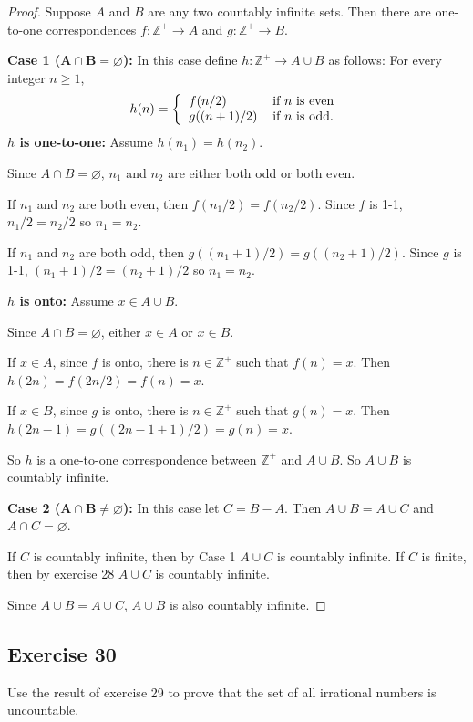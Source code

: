 \documentclass[14pt]{extarticle}
\newcommand{\es}{\varnothing}
\newcommand{\Z}{\mathbb{Z}}
\begin{document}
\begin{proof}
    Suppose $A$ and $B$ are any two countably infinite sets. Then there are one-to-one correspondences \(f: \Z^+ \to A\) and \(g: \Z^+ \to B\).

        {\bf Case 1 (\(\bm{A \cap B = \es}\)):} In this case define \(h: \Z^+ \to A \cup B\) as follows: For every integer \(n \geq 1\),
    \[
        h(n) =
        \left\{
        \begin{tabular}{ll}
            \(f(n/2)\)     & if $n$ is even \\
            \(g((n+1)/2)\) & if $n$ is odd.
        \end{tabular}
        \right.
    \]
    {\bf $h$ is one-to-one:} Assume \(h(n_1) = h(n_2)\).

    Since \(A \cap B = \es\), $n_1$ and $n_2$ are either both odd or both even.

    If $n_1$ and $n_2$ are both even, then \(f(n_1/2) =f(n_2/2)\). Since $f$ is 1-1, \(n_1/2 = n_2/2\) so \(n_1 = n_2\).

    If $n_1$ and $n_2$ are both odd, then \(g((n_1+1)/2) = g((n_2+1)/2)\). Since $g$ is 1-1, \((n_1+1)/2 = (n_2+1)/2\)
    so \(n_1 = n_2\).

        {\bf $h$ is onto:} Assume \(x \in A \cup B\).

    Since \(A \cap B = \es\), either \(x \in A\) or \(x \in B\).

    If \(x \in A\), since $f$ is onto, there is $n \in \Z^+$ such that \(f(n) = x\). Then \(h(2n) = f(2n/2) =f(n) = x\).

    If \(x \in B\), since $g$ is onto, there is $n \in \Z^+$ such that \(g(n) = x\).
    Then \(h(2n-1) = g((2n-1+1)/2) = g(n) = x\).

    So $h$ is a one-to-one correspondence between \(\Z^+\) and \(A \cup B\). So \(A \cup B\) is countably infinite.

        {\bf Case 2 (\(\bm{A \cap B \neq \es}\)):} In this case let \(C = B - A\). Then \(A \cup B = A \cup C\) and \(A \cap C
    = \es\).

    If $C$ is countably infinite, then by Case 1 \(A \cup C\) is countably infinite. If $C$ is finite, then by exercise
    28 \(A \cup C\) is countably infinite.

    Since \(A \cup B = A \cup C\), \(A \cup B\) is also countably infinite.
\end{proof}

\subsection{Exercise 30}
Use the result of exercise 29 to prove that the set of all irrational numbers is uncountable.
\end{document}
